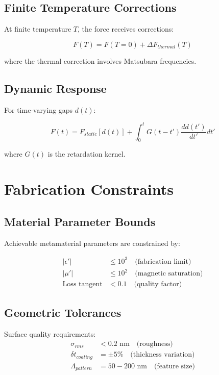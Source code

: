 \documentclass{article}
\begin{document}
\subsection{Finite Temperature Corrections}

At finite temperature $T$, the force receives corrections:

\begin{equation}
F(T) = F(T=0) + \Delta F_{thermal}(T)
\end{equation}

where the thermal correction involves Matsubara frequencies.

\subsection{Dynamic Response}

For time-varying gaps $d(t)$:

\begin{equation}
F(t) = F_{static}[d(t)] + \int_0^t G(t-t') \frac{dd(t')}{dt'} dt'
\end{equation}

where $G(t)$ is the retardation kernel.

\section{Fabrication Constraints}

\subsection{Material Parameter Bounds}

Achievable metamaterial parameters are constrained by:

\begin{align}
|\epsilon'| &\leq 10^3 \quad \text{(fabrication limit)}\\
|\mu'| &\leq 10^2 \quad \text{(magnetic saturation)}\\
\text{Loss tangent} &< 0.1 \quad \text{(quality factor)}
\end{align}

\subsection{Geometric Tolerances}

Surface quality requirements:
\begin{align}
\sigma_{rms} &< 0.2 \text{ nm} \quad \text{(roughness)}\\
\delta t_{coating} &= \pm 5\% \quad \text{(thickness variation)}\\
\Lambda_{pattern} &= 50-200 \text{ nm} \quad \text{(feature size)}
\end{align}
\end{document}
